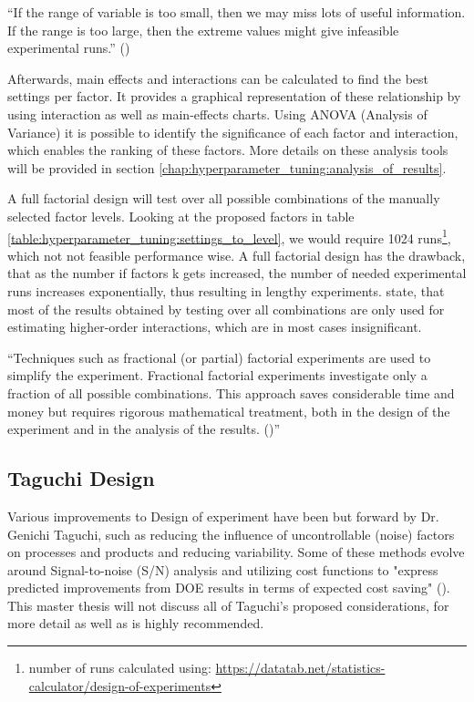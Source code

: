 \enquote{If the range of variable is too small, then we may miss lots of useful information. If the range is too large, then the extreme values might give infeasible experimental runs.} (\cite{yang_design_2009})

Afterwards, main effects and interactions can be calculated to find the best settings per factor. It provides a graphical representation of these relationship by using interaction as well as main-effects charts.
Using ANOVA (Analysis of Variance) it is possible to identify the significance of each factor and interaction, which enables the ranking of these factors. More details on these analysis tools will be provided in section \ref{chap:hyperparameter_tuning:analysis_of_results}.

A full factorial design will test over all possible combinations of the manually selected factor levels. Looking at the proposed factors in table \ref{table:hyperparameter_tuning:settings_to_level}, we would require 1024 runs\footnote{number of runs calculated using: \url{https://datatab.net/statistics-calculator/design-of-experiments}}, which not not feasible performance wise. A full factorial design has the drawback, that as the number if factors k gets increased, the number of needed experimental runs increases exponentially, thus resulting in lengthy experiments. \cite{yang_design_2009} state, that most of the results obtained by testing over all combinations are only used for estimating higher-order interactions, which are in most cases insignificant.

\enquote{Techniques such as fractional (or partial) factorial experiments are used to simplify the experiment. Fractional factorial experiments investigate only a fraction of all possible combinations. This approach saves considerable time and money but requires rigorous mathematical treatment, both in the design of the experiment and in the analysis of the results. (\cite{roy_primer_1990})}


\subsection{Taguchi Design}
Various improvements to Design of experiment have been but forward by Dr. Genichi Taguchi, such as reducing the influence of uncontrollable (noise) factors on processes and products and reducing variability. Some of these methods evolve around Signal-to-noise (S/N) analysis and utilizing cost functions to "express predicted improvements from DOE results in terms of expected cost saving" (\cite{roy_primer_1990}). This master thesis will not discuss all of Taguchi's proposed considerations, for more detail \cite{roy_primer_1990} as well as \cite{yang_design_2009} is highly recommended.

